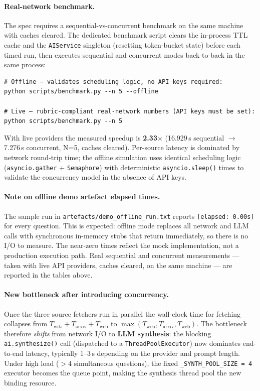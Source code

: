 \documentclass[12pt,a4paper]{article}
\begin{document}
\paragraph{Real-network benchmark.}
The spec requires a sequential-vs-concurrent benchmark on the same machine with caches cleared.
The dedicated benchmark script clears the in-process TTL cache and the
\texttt{AIService} singleton (resetting token-bucket state) before each timed run, then
executes sequential and concurrent modes back-to-back in the same process:

\begin{verbatim}
# Offline — validates scheduling logic, no API keys required:
python scripts/benchmark.py --n 5 --offline

# Live — rubric-compliant real-network numbers (API keys must be set):
python scripts/benchmark.py --n 5
\end{verbatim}

With live providers the measured speedup is \textbf{2.33$\times$} (16.929\,s sequential
$\to$ 7.276\,s concurrent, N=5, caches cleared).  Per-source latency is dominated by
network round-trip time; the offline simulation uses identical scheduling logic
(\texttt{asyncio.gather} + \texttt{Semaphore}) with deterministic
\texttt{asyncio.sleep()} times to validate the concurrency model in the absence of
API keys.

\paragraph{Note on offline demo artefact elapsed times.}
The sample run in \texttt{artefacts/demo\_offline\_run.txt} reports \texttt{[elapsed: 0.00s]}
for every question.  This is expected: offline mode replaces all network and LLM calls with
synchronous in-memory stubs that return immediately, so there is no I/O to measure.
The near-zero times reflect the mock implementation, not a production execution path.
Real sequential and concurrent measurements — taken with live API providers, caches cleared,
on the same machine — are reported in the tables above.

\paragraph{New bottleneck after introducing concurrency.}
Once the three source fetchers run in parallel the wall-clock time for fetching collapses
from $T_{\text{wiki}} + T_{\text{arxiv}} + T_{\text{web}}$ to
$\max(T_{\text{wiki}}, T_{\text{arxiv}}, T_{\text{web}})$.  The bottleneck therefore
\emph{shifts} from network I/O to \textbf{LLM synthesis}: the blocking
\texttt{ai.synthesize()} call (dispatched to a \texttt{ThreadPoolExecutor}) now dominates
end-to-end latency, typically 1--3\,s depending on the provider and prompt length.  Under
high load (${>}4$ simultaneous questions), the fixed \texttt{\_SYNTH\_POOL\_SIZE\,=\,4}
executor becomes the queue point, making the synthesis thread pool the new binding
resource.
\end{document}
